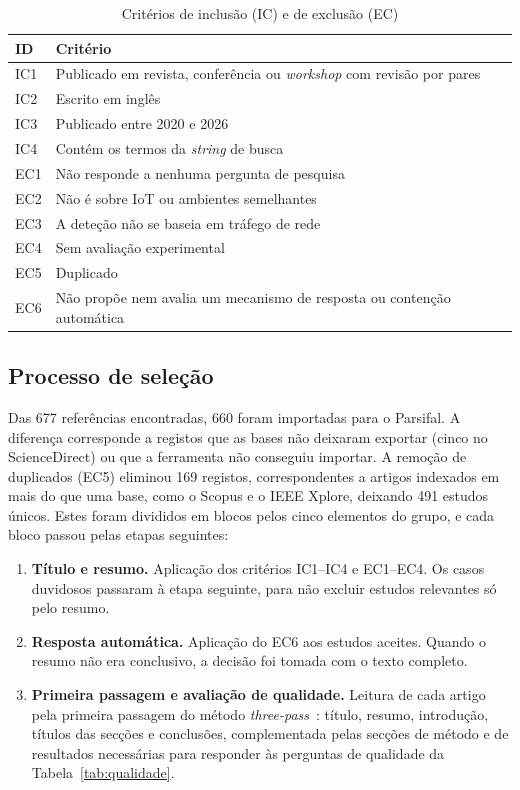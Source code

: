\documentclass[conference,a4paper]{IEEEtran}
\begin{document}
\begin{table}[H]
\caption{Critérios de inclusão (IC) e de exclusão (EC)}\label{tab:criterios}
\centering\footnotesize
\begin{tabular}{@{}p{}p{}@{}}
\toprule
ID & Critério \\
\midrule
IC1 & Publicado em revista, conferência ou \textit{workshop} com revisão por pares \\
IC2 & Escrito em inglês \\
IC3 & Publicado entre 2020 e 2026 \\
IC4 & Contém os termos da \textit{string} de busca \\
\midrule
EC1 & Não responde a nenhuma pergunta de pesquisa \\
EC2 & Não é sobre IoT ou ambientes semelhantes \\
EC3 & A deteção não se baseia em tráfego de rede \\
EC4 & Sem avaliação experimental \\
EC5 & Duplicado \\
EC6 & Não propõe nem avalia um mecanismo de resposta ou contenção automática \\
\bottomrule
\end{tabular}
\end{table}

\subsection{Processo de seleção}
Das 677 referências encontradas, 660 foram importadas para o Parsifal. A diferença
corresponde a registos que as bases não deixaram exportar (cinco no ScienceDirect) ou que
a ferramenta não conseguiu importar. A remoção de duplicados (EC5) eliminou 169
registos, correspondentes a artigos indexados em mais do que uma base, como o Scopus e o IEEE Xplore,
deixando 491 estudos únicos. Estes foram divididos em blocos pelos cinco elementos do
grupo, e cada bloco passou pelas etapas seguintes:
\begin{enumerate}
  \item \textbf{Título e resumo.} Aplicação dos critérios IC1--IC4 e EC1--EC4. Os casos
  duvidosos passaram à etapa seguinte, para não excluir estudos relevantes só pelo
  resumo.
  \item \textbf{Resposta automática.} Aplicação do EC6 aos estudos aceites. Quando o
  resumo não era conclusivo, a decisão foi tomada com o texto completo.
  \item \textbf{Primeira passagem e avaliação de qualidade.} Leitura de cada artigo pela
  primeira passagem do método \textit{three-pass}~\cite{keshav2007read}: título, resumo,
  introdução, títulos das secções e conclusões, complementada pelas secções de método e
  de resultados necessárias para responder às perguntas de qualidade da
  Tabela~\ref{tab:qualidade}.
\end{enumerate}
\end{document}
